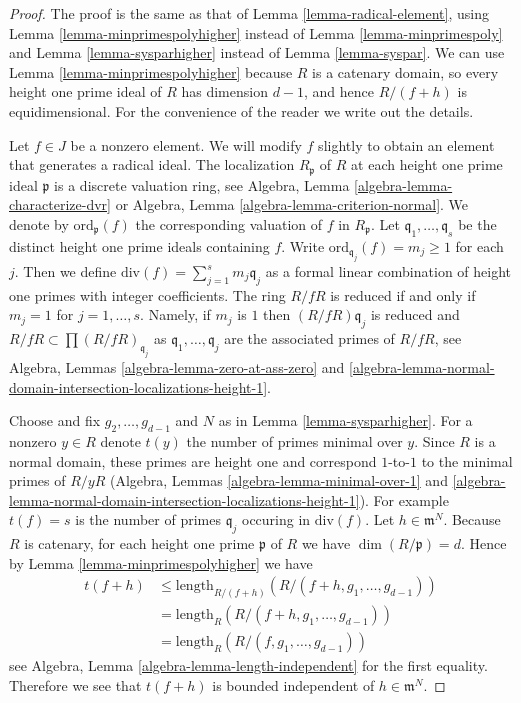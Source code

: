 \begin{proof}
The proof is the same as that of
Lemma \ref{lemma-radical-element},
using Lemma \ref{lemma-minprimespolyhigher} instead of
Lemma \ref{lemma-minprimespoly} and
Lemma \ref{lemma-sysparhigher} instead of
Lemma \ref{lemma-syspar}.
We can use Lemma \ref{lemma-minprimespolyhigher} because $R$
is a catenary domain, so every height one prime ideal of $R$
has dimension $d - 1$, and hence $R/(f + h)$ is
equidimensional. For the convenience of the reader we write out
the details.

\medskip\noindent
Let $f \in J$ be a nonzero element.
We will modify $f$ slightly to obtain an element that generates a radical ideal.
The localization $R_\mathfrak p$ of $R$ at each height one prime
ideal $\mathfrak p$ is a discrete valuation ring, see
Algebra, Lemma \ref{algebra-lemma-characterize-dvr} or
Algebra, Lemma \ref{algebra-lemma-criterion-normal}.
We denote by $\text{ord}_\mathfrak p(f)$ the corresponding
valuation of $f$ in $R_{\mathfrak p}$. Let
$\mathfrak q_1, \ldots, \mathfrak q_s$
be the distinct height one prime ideals containing $f$.
Write $\text{ord}_{\mathfrak q_j}(f) = m_j \geq 1$
for each $j$. Then we define
$\text{div}(f) = \sum_{j = 1}^s m_j\mathfrak q_j$
as a formal linear combination of
height one primes with integer coefficients.
The ring $R/fR$ is reduced if and only if
$m_j = 1$ for $j = 1, \ldots, s$. Namely, if $m_j$ is $1$ then
$(R/fR)\mathfrak q_j$ is reduced and
$R/fR \subset \prod (R/fR)_{\mathfrak q_j}$ as
$\mathfrak q_1, \ldots, \mathfrak q_j$ are the associated primes
of $R/fR$, see Algebra, Lemmas
\ref{algebra-lemma-zero-at-ass-zero} and
\ref{algebra-lemma-normal-domain-intersection-localizations-height-1}.

\medskip\noindent
Choose and fix $g_2, \ldots, g_{d - 1}$ and $N$ as in
Lemma \ref{lemma-sysparhigher}.
For a nonzero $y \in R$ denote $t(y)$ the number of primes minimal over $y$.
Since $R$ is a normal domain, these primes
are height one and correspond $1$-to-$1$ to the minimal primes of
$R/yR$ (Algebra, Lemmas \ref{algebra-lemma-minimal-over-1} and
\ref{algebra-lemma-normal-domain-intersection-localizations-height-1}).
For example $t(f) = s$ is the number
of primes $\mathfrak q_j$ occuring in $\text{div}(f)$.
Let $h \in \mathfrak m^N$. Because $R$ is catenary, for each
height one prime $\mathfrak p$ of $R$ we have
$\dim(R/\mathfrak p) = d$. Hence by
Lemma \ref{lemma-minprimespolyhigher}
we have
\begin{align*}
t(f + h) & \leq \text{length}_{R/(f + h)}(R/(f + h, g_1, \ldots, g_{d - 1})) \\
& = \text{length}_R(R/(f + h, g_1, \ldots, g_{d - 1})) \\
& = \text{length}_R(R/(f, g_1, \ldots, g_{d - 1}))
\end{align*}
see Algebra, Lemma \ref{algebra-lemma-length-independent}
for the first equality.
Therefore we see that $t(f + h)$ is bounded independent of
$h \in \mathfrak m^N$.


\end{proof}

